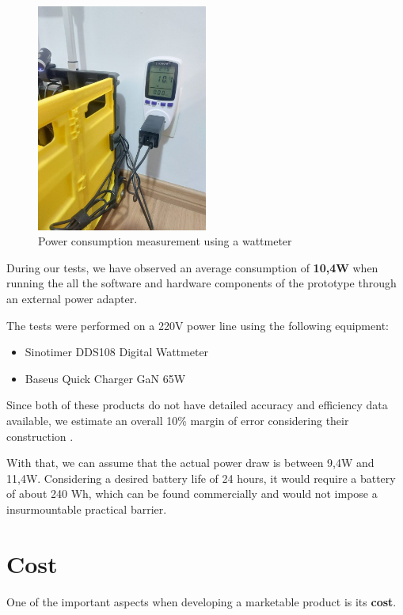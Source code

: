 \documentclass[openright]{normas-utf-tex} %
\begin{document}
\begin{figure}[H]
	\centering
	\includegraphics[width=0.5\textwidth]{./images/powerconsumption.jpeg}
	\caption[Power consumption measurement using a wattmeter]{Power consumption measurement using a wattmeter}
    \label{fig:wattmeter}
\end{figure}

During our tests, we have observed an average consumption of \textbf{10,4W}
when running the all the software and hardware components of the prototype
through an external power adapter. 

The tests were performed on a 220V power line using the following equipment:
\begin{itemize}
    \item Sinotimer DDS108 Digital Wattmeter
    \item Baseus Quick Charger GaN 65W
\end{itemize}

Since both of these products do not have detailed accuracy and efficiency data
available, we estimate an overall 10\% margin of error considering their
construction \cite{Chen2017}. 

With that, we can assume that the actual power draw is between 9,4W and 11,4W.
Considering a desired  battery life of 24 hours, it would require a battery of
about 240 Wh, which can be found commercially and would not impose a
insurmountable practical barrier.

\section{Cost}

One of the important aspects when developing a marketable product is its \textbf{cost}.
\end{document}
